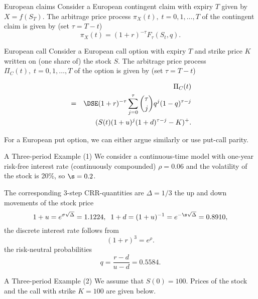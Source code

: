 European claims
	Consider a European contingent claim with expiry $T$ given by
	$X=f(S_T)$. The arbitrage price process $\pi_X(t), \; t=0, 1,
	\ldots, T$ of the contingent claim is given by (set $\tau=T-t$)
		\begin{equation}\label{crrcontclaimprice}
		\pi_X(t) = (1+r)^{-\tau} F_\tau(S_t,q).
		\end{equation}


European call
	Consider a European call option with expiry $T$ and strike price
	$K$ written on (one share of) the stock $S$. The arbitrage price
	process $\Pi_C(t), \; t=0, 1, \ldots, T$ of the option is given by
	(set $\tau=T-t$)
		
		\begin{eqnarray}\label{crrcallprice}
		&& \Pi_C(t)\\\nonumber
		&=&\DSE (1+r)^{-\tau} \sum_{j=0}^{\tau} {{\tau} \choose j}
		{q}^j (1 - q)^{\tau-j}\\\nonumber
		&&(S(t) (1+u)^j (1+d)^{\tau-j} - K)^+.
		\end{eqnarray}
 
	For a European put option, we can either argue similarly or use put-call parity.


A Three-period Example (1)
	We consider a continuous-time model with one-year risk-free interest rate (continuously compounded) $\rho=0.06$ and the volatility of the stock is 20\%, so $\s = 0.2$.
	
	The corresponding 3-step CRR-quantities are $\Delta =1/3$
		the up and down movements of the stock price
			$$
			1+u=e^{\sigma \sqrt{\Delta}} = 1.1224, \; \;
			1+d =
			(1+u)^{-1} = e^{-\s \sqrt{\Delta}} = 0.8910,
			$$
		the discrete interest rate follows from
			$$
			(1+r)^3= e^\rho.
			$$
		the risk-neutral probabilities
			$$
			q=\frac{r-d}{u-d}= 0.5584.
			$$


A Three-period Example (2)
	We assume that $S(0)=100$. Prices of the stock and the call  with strike $K=100$ are given below.
		
